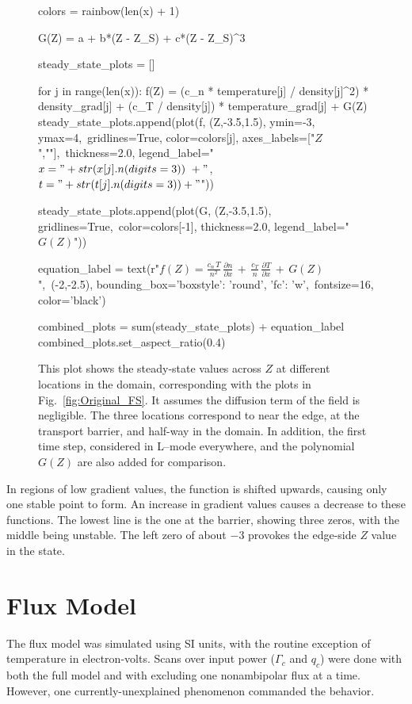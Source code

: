 \begin{figure}[tb]
\begin{sagesilent}
		colors = rainbow(len(x) + 1)

		G(Z) = a + b*(Z - Z_S) + c*(Z - Z_S)^3

		steady_state_plots = []

		for j in range(len(x)):
		    f(Z) = (c_n * temperature[j] / density[j]^2) * density_grad[j] + (c_T / density[j]) * temperature_grad[j] + G(Z)
		    steady_state_plots.append(plot(f, (Z,-3.5,1.5), ymin=-3, ymax=4,\
		    		gridlines=True, color=colors[j], axes_labels=["$Z$",""],\
		    		thickness=2.0, legend_label="$x = " +str(x[j].n(digits=3))\
		    		+"$, $t = " +str(t[j].n(digits=3))+ "$"))

		steady_state_plots.append(plot(G, (Z,-3.5,1.5), gridlines=True,\
				color=colors[-1], thickness=2.0, legend_label="$G(Z)$"))

		equation_label = text(r"$f(Z) = \frac{c_n \, T}{n^2} \, \frac{\partial n}{\partial x} \,+\, \frac{c_T}{n} \, \frac{\partial T}{\partial x} \,+\, G(Z)$",\
				(-2,-2.5), bounding_box={'boxstyle': 'round', 'fc': 'w'},\
				fontsize=16, color='black')

		combined_plots = sum(steady_state_plots) + equation_label
		combined_plots.set_aspect_ratio(0.4)
	\end{sagesilent}
	\sageplot[width=0.9\textwidth]{combined_plots}
	\caption{This plot shows the steady-state values across $Z$ at different locations in the domain, corresponding with the plots in Fig.~\ref{fig:Original_FS}.
	It assumes the diffusion term of the field is negligible.
	The three locations correspond to near the edge, at the transport barrier, and half-way in the domain.
	In addition, the first time step, considered in L--mode everywhere, and the polynomial $G(Z)$ are also added for comparison.}
	\label{fig:original_stationary_vs_Z}
\end{figure}

In regions of low gradient values, the function is shifted upwards, causing only one stable point to form.
An increase in gradient values causes a decrease to these functions.
The lowest line is the one at the barrier, showing three zeros, with the middle being unstable.
The left zero of about $-3$ provokes the edge-side $Z$ value in the state.

\section{Flux Model} \label{sec:flux_results}
The flux model was simulated using SI units, with the routine exception of temperature in electron-volts.
Scans over input power ($\Gamma_c$ and $q_c$) were done with both the full model and with excluding one nonambipolar flux at a time.
However, one currently-unexplained phenomenon commanded the behavior.


